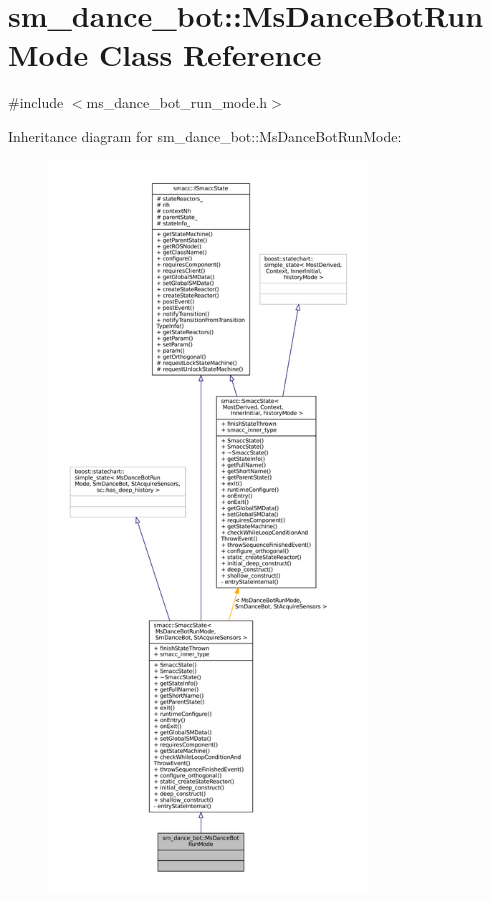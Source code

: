 \hypertarget{classsm__dance__bot_1_1MsDanceBotRunMode}{}\section{sm\+\_\+dance\+\_\+bot\+:\+:Ms\+Dance\+Bot\+Run\+Mode Class Reference}
\label{classsm__dance__bot_1_1MsDanceBotRunMode}


{\ttfamily \#include $<$ms\+\_\+dance\+\_\+bot\+\_\+run\+\_\+mode.\+h$>$}



Inheritance diagram for sm\+\_\+dance\+\_\+bot\+:\+:Ms\+Dance\+Bot\+Run\+Mode\+:
\nopagebreak
\begin{figure}[H]
\begin{center}
\leavevmode
\includegraphics[height=550pt]{classsm__dance__bot_1_1MsDanceBotRunMode__inherit__graph}
\end{center}
\end{figure}


